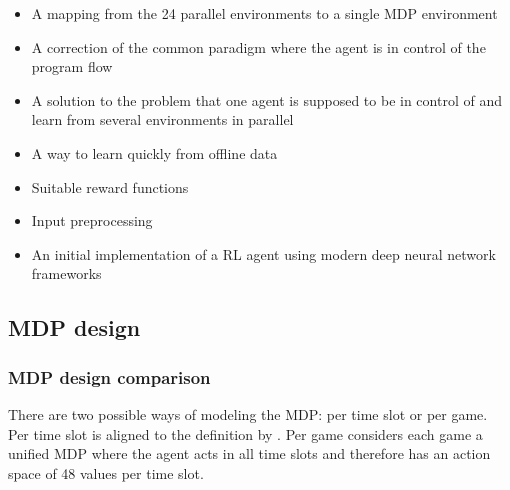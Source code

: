 \begin{itemize}
    \item A mapping from the 24 parallel environments to a single \ac{MDP} environment
    \item A correction of the common paradigm where the agent is in control of the program flow
    \item A solution to the problem that one agent is supposed to be in control of and learn from several
        environments in parallel
    \item A way to learn quickly from offline data
    \item Suitable reward functions
    \item Input preprocessing
    \item An initial implementation of a \ac{RL} agent using modern deep neural network frameworks
\end{itemize}

\subsection{\ac{MDP} design}%
\label{sub:mdp_modelling_comparison}

\subsubsection{\ac{MDP} design comparison}%
\label{ssub:mdp_design_comparison}

There are two possible ways of modeling the \ac{MDP}: per time slot or per game. Per time slot is aligned to the
definition by \citet{tactexurieli2016mdp}. Per game considers each game a unified \ac{MDP} where the agent acts in all
time slots and therefore has an action space of 48 values per time slot.


